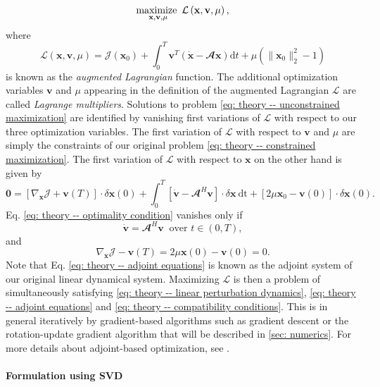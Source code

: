       \begin{equation}
        \maximize \limits_{\mathbf{x}, \mathbf{v}, \mu} \mathcal{L} \left( \mathbf{x}, \mathbf{v}, \mu \right),
        \label{eq: theory -- unconstrained maximization}
      \end{equation}
      where
      \begin{equation}
        \mathcal{L} \left( \mathbf{x}, \mathbf{v}, \mu \right) = \mathcal{J}\left( \mathbf{x}_0 \right) + \int_{0}^T \mathbf{v}^T \left( \dot{\mathbf{x}} - \mathbfcal{A}\mathbf{x} \right) \mathrm{d}t + \mu \left( \| \mathbf{x}_0 \|_2^2 - 1 \right)
        \label{eq: theory -- augmented Lagrangian}
      \end{equation}
      is known as the \emph{augmented Lagrangian} function. The additional optimization variables $\mathbf{v}$ and $\mu$ appearing in the definition of the augmented Lagrangian $\mathcal{L}$ are called \emph{Lagrange multipliers}. Solutions to problem \eqref{eq: theory -- unconstrained maximization} are identified by vanishing first variations of $\mathcal{L}$ with respect to our three optimization variables. The first variation of $\mathcal{L}$ with respect to $\mathbf{v}$ and $\mu$ are simply the constraints of our original problem \eqref{eq: theory -- constrained maximization}. The first variation of $\mathcal{L}$ with respect to $\mathbf{x}$ on the other hand is given by
      \begin{equation}
        \mathbf{0} = \left[ \nabla_{\mathbf{x}} \mathcal{J} + \mathbf{v}(T) \right] \cdot \delta \mathbf{x}(0) + \int_0^T \left[ \dot{\mathbf{v}} - \mathbfcal{A}^H \mathbf{v} \right] \cdot \delta \mathbf{x} \ \mathrm{dt} + \left[ 2\mu \mathbf{x}_0 - \mathbf{v}(0) \right] \cdot \delta \mathbf{x}(0).
        \label{eq: theory -- optimality condition}
      \end{equation}
      Eq. \eqref{eq: theory -- optimality condition} vanishes only if
      \begin{equation}
        \dot{\mathbf{v}} = \mathbfcal{A}^H \mathbf{v} \ \text{ over } t \in \left( 0, T \right),
        \label{eq: theory -- adjoint equations}
      \end{equation}
      and
      \begin{equation}
        \nabla_{\mathbf{x}} \mathcal{J} - \mathbf{v}(T) = 2\mu \mathbf{x}(0) - \mathbf{v}(0) = 0.
        \label{eq: theory -- compatibility conditions}
      \end{equation}
      Note that Eq. \eqref{eq: theory -- adjoint equations} is known as the adjoint system of our original linear dynamical system. Maximizing $\mathcal{L}$ is then a problem of simultaneously satisfying \eqref{eq: theory -- linear perturbation dynamics}, \eqref{eq: theory -- adjoint equations} and \eqref{eq: theory -- compatibility conditions}. This is in general iteratively by gradient-based algorithms such as gradient descent or the rotation-update gradient algorithm that will be described in \textsection \ref{sec: numerics}. For more details about adjoint-based optimization, see \cite{book:boyd:2004, nonlinear_optimal:kerswell:2014}.

      \paragraph{Formulation using SVD}
      \label{paragraph: theory -- optimal perturbation svd}
